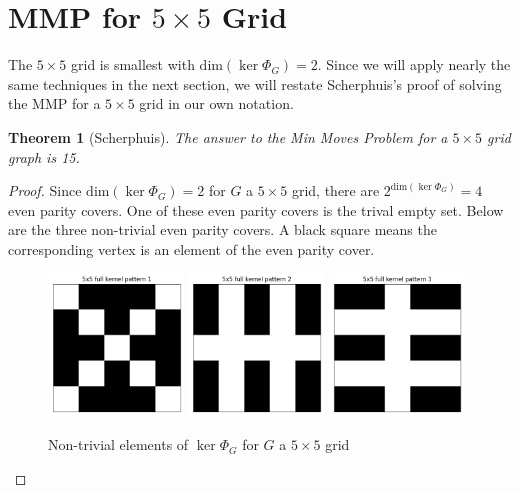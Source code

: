 \documentclass[a4paper]{article}
\newtheorem{theorem}{Theorem}
\renewcommand{\dim}[1]{\text{dim}\left( #1 \right)}
\begin{document}
	\section{MMP for $5 \times 5$ Grid}
	The $5 \times 5$ grid is smallest with $\dim{\ker{\Phi_G}} = 2$.
	Since we will apply nearly the same techniques in the next section, we will restate Scherphuis's proof of solving the MMP for a $5 \times 5$ grid in our own notation.
	\begin{theorem}[Scherphuis]\label{min-moves-problem-5x5}
		The answer to the Min Moves Problem for a $5 \times 5$ grid graph is 15.
	\end{theorem}
	\begin{proof}
		Since $\dim{\ker{\Phi_G}} = 2$ for $G$ a $5 \times 5$ grid, there are $2^{\dim{\ker{\Phi_G}}} = 4$ even parity covers.
		One of these even parity covers is the trival empty set.
		Below are the three non-trivial even parity covers.
		A black square means the corresponding vertex is an element of the even parity cover.
		
		\begin{figure}[H]
			\centering
			\includegraphics[width=0.32\textwidth]{../../code/serialization/kernels/5x5/full/5x5_kernel_full_1.png}
			\includegraphics[width=0.32\textwidth]{../../code/serialization/kernels/5x5/full/5x5_kernel_full_2.png}
			\includegraphics[width=0.32\textwidth]{../../code/serialization/kernels/5x5/full/5x5_kernel_full_3.png}
			\caption{Non-trivial elements of $\ker{\Phi_G}$ for $G$ a $5 \times 5$ grid}
		\end{figure}
	

\end{proof}
\end{document}
